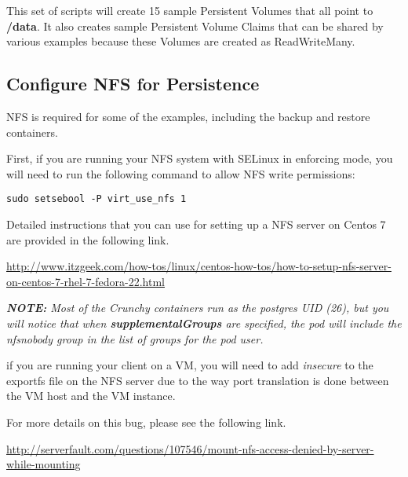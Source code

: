 \documentclass[letterpaper,12pt]{article}
\begin{document}
This set of scripts will create 15 sample Persistent Volumes that all point to \textbf{/data}. It also creates sample Persistent Volume Claims that can be shared by various examples because these Volumes are created as ReadWriteMany.

\subsection{Configure NFS for Persistence}\label{/_configure_container_storage/_configure_nfs_for_persistence}

NFS is required for some of the examples, including the backup and restore containers.

First, if you are running your NFS system with SELinux in enforcing mode, you will need to run the following command to allow NFS write permissions:
\vspace{.75em}
\begin{lstlisting}
sudo setsebool -P virt_use_nfs 1
\end{lstlisting}

Detailed instructions that you can use for setting up a NFS server on Centos 7 are provided in the following link.

\href{http://www.itzgeek.com/how-tos/linux/centos-how-tos/how-to-setup-nfs-server-on-centos-7-rhel-7-fedora-22.html}{http://www.itzgeek.com/how-tos/linux/centos-how-tos/how-to-setup-nfs-server-on-centos-7-rhel-7-fedora-22.html}

\begin{leftbar}
\textit{\textbf{NOTE: }Most of the Crunchy containers run as the postgres UID (26), but you will notice that when \textbf{supplementalGroups} are specified, the pod will include the nfsnobody group in the list of groups for the pod user.}
\end{leftbar}

if you are running your client on a VM, you will need to add \textit{insecure} to the exportfs file on the NFS server due to the way port translation is done between the VM host and the VM instance.

For more details on this bug, please see the following link.

\href{http://serverfault.com/questions/107546/mount-nfs-access-denied-by-server-while-mounting}{http://serverfault.com/questions/107546/mount-nfs-access-denied-by-server-while-mounting}
\end{document}

